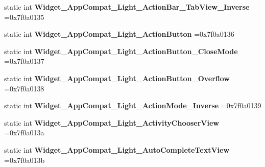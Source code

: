 \begin{DoxyCompactItemize}
\item 
\mbox{\label{classandroid_1_1support_1_1v7_1_1appcompat_1_1R_1_1style_a0871796ca0758d895d3b1e8b51f852f6}} 
static int {\bfseries Widget\+\_\+\+App\+Compat\+\_\+\+Light\+\_\+\+Action\+Bar\+\_\+\+Tab\+View\+\_\+\+Inverse} =0x7f0a0135
\item 
\mbox{\label{classandroid_1_1support_1_1v7_1_1appcompat_1_1R_1_1style_aeee578bc75da8e26acdfb82fa4b65512}} 
static int {\bfseries Widget\+\_\+\+App\+Compat\+\_\+\+Light\+\_\+\+Action\+Button} =0x7f0a0136
\item 
\mbox{\label{classandroid_1_1support_1_1v7_1_1appcompat_1_1R_1_1style_a7c9925cce1cb475851d741a812a97988}} 
static int {\bfseries Widget\+\_\+\+App\+Compat\+\_\+\+Light\+\_\+\+Action\+Button\+\_\+\+Close\+Mode} =0x7f0a0137
\item 
\mbox{\label{classandroid_1_1support_1_1v7_1_1appcompat_1_1R_1_1style_a17d76adf9eb03498a0e435888fb54b6d}} 
static int {\bfseries Widget\+\_\+\+App\+Compat\+\_\+\+Light\+\_\+\+Action\+Button\+\_\+\+Overflow} =0x7f0a0138
\item 
\mbox{\label{classandroid_1_1support_1_1v7_1_1appcompat_1_1R_1_1style_a0527dc2f80a353d8e353790ef8a27f30}} 
static int {\bfseries Widget\+\_\+\+App\+Compat\+\_\+\+Light\+\_\+\+Action\+Mode\+\_\+\+Inverse} =0x7f0a0139
\item 
\mbox{\label{classandroid_1_1support_1_1v7_1_1appcompat_1_1R_1_1style_ab1d629b2deedf35155438448b1a4993c}} 
static int {\bfseries Widget\+\_\+\+App\+Compat\+\_\+\+Light\+\_\+\+Activity\+Chooser\+View} =0x7f0a013a
\item 
\mbox{\label{classandroid_1_1support_1_1v7_1_1appcompat_1_1R_1_1style_a28f57f1775eebb770a9a17249e2483be}} 
static int {\bfseries Widget\+\_\+\+App\+Compat\+\_\+\+Light\+\_\+\+Auto\+Complete\+Text\+View} =0x7f0a013b
\item 

\end{DoxyCompactItemize}
